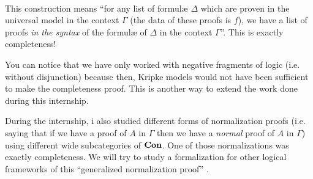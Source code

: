 \documentclass[10pt,a4paper]{article}
\begin{document}
			\begin{center}
			\begin{code}
				\>[4]\AgdaSpace{}%
				\AgdaSymbol{:}\AgdaSpace{}%
				\AgdaSymbol{\{}\AgdaSpace{}%
				\AgdaSpace{}%
				\AgdaSymbol{:}\AgdaSpace{}%
				\AgdaSymbol{\}}\AgdaSpace{}%
				\AgdaSpace{}%
				\AgdaSymbol{(\{}\AgdaSpace{}%
				\AgdaSymbol{:}\AgdaSpace{}%
				\AgdaSymbol{\}}\AgdaSpace{}%
				\AgdaSpace{}%
				\AgdaSpace{}%
				\AgdaSpace{}%
				\AgdaSpace{}%
				\AgdaSpace{}%
				\AgdaSpace{}%
				\AgdaSpace{}%
				\AgdaSpace{}%
				\AgdaSpace{}%
				\AgdaSpace{}%
				\AgdaSymbol{)}%
				\>[99]\AgdaSpace{}%
				\AgdaSpace{}%
				\AgdaSpace{}%
				\<%
				\\
				\>[4]\AgdaSpace{}%
				\AgdaSymbol{\{}\AgdaSymbol{\}}\AgdaSpace{}%
				\AgdaSymbol{\{}\AgdaSymbol{\}}\AgdaSpace{}%
				\AgdaSpace{}%
				\AgdaSymbol{=}\AgdaSpace{}%
				\AgdaSpace{}%
				\AgdaSpace{}%
				\AgdaSpace{}%
				\AgdaSymbol{(}\AgdaSpace{}%
				\AgdaSymbol{\{}\AgdaSymbol{\}}\AgdaSpace{}%
				\AgdaSymbol{(}\AgdaSpace{}%
				\AgdaSpace{}%
				\AgdaSpace{}%
				\AgdaSymbol{))}\<%
			\end{code}
			\end{center}
		
		This construction means \enquote{for any list of formulæ $\Delta$ which are proven in the universal model in the context $\Gamma$ (the data of these proofs is $f$), we have a list of proofs \emph{in the syntax} of the formulæ of $\Delta$ in the context $\Gamma$}. This is exactly completeness!
		
		You can notice that we have only worked with negative fragments of logic (i.e. without disjunction) because then, Kripke models would not have been sufficient to make the completeness proof. This is another way to extend the work done during this internship.
		
		During the internship, i also studied different forms of normalization proofs (i.e. saying that if we have a proof of $A$ in $\Gamma$ then we have a \emph{normal} proof of $A$ in $\Gamma$) using different wide subcategories of $\textbf{Con}$. One of those normalizations was exactly completeness. We will try to study a formalization for other logical frameworks of this \enquote{generalized normalization proof} \cite{RedFreeNorm1995}.
		
\end{document}
